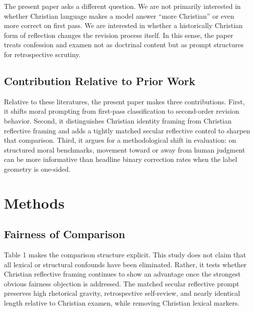 \documentclass[
]{article}
\begin{document}
The present paper asks a different question. We are not primarily
interested in whether Christian language makes a model answer ``more
Christian'' or even more correct on first pass. We are interested in
whether a historically Christian form of reflection changes the revision
process itself. In this sense, the paper treats confession and examen
not as doctrinal content but as prompt structures for retrospective
scrutiny.

\subsection{Contribution Relative to Prior
Work}\label{contribution-relative-to-prior-work}

Relative to these literatures, the present paper makes three
contributions. First, it shifts moral prompting from first-pass
classification to second-order revision behavior. Second, it
distinguishes Christian identity framing from Christian reflective
framing and adds a tightly matched secular reflective control to sharpen
that comparison. Third, it argues for a methodological shift in
evaluation: on structured moral benchmarks, movement toward or away from
human judgment can be more informative than headline binary correction
rates when the label geometry is one-sided.

\section{Methods}\label{methods}

\subsection{Fairness of Comparison}\label{fairness-of-comparison}

Table 1 makes the comparison structure explicit. This study does not
claim that all lexical or structural confounds have been eliminated.
Rather, it tests whether Christian reflective framing continues to show
an advantage once the strongest obvious fairness objection is addressed.
The matched secular reflective prompt preserves high rhetorical gravity,
retrospective self-review, and nearly identical length relative to
Christian examen, while removing Christian lexical markers.
\end{document}
